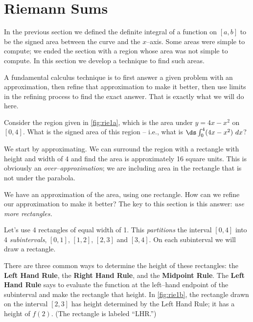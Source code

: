 \section{Riemann Sums}\label{sec:riemann}

In the previous section we defined the definite integral of a function on $[a,b]$ to be the signed area between the curve and the $x$--axis. Some areas were simple to compute; we ended the section with a region whose area was not simple to compute. In this section we develop a technique to find such areas.

A fundamental calculus technique is to first answer a given problem with an approximation, then refine that approximation to make it better, then use limits in the refining process to find the exact answer. That is exactly what we will do here.

Consider the region given in \autoref{fig:rie1a}, which is the area under $y=4x-x^2$ on $[0,4]$. What is the signed area of this region -- i.e., what is $\ds\int_0^4(4x-x^2)\ dx$?


We start by approximating. We can surround the region with a rectangle with height and width of 4 and find the area is approximately 16 square units. This is obviously an \textit{over--approximation}; we are including area in the rectangle that is not under the parabola. 


We have an approximation of the area, using one rectangle. How can we refine our approximation to make it better? The key to this section is this answer: \textit{use more rectangles.}

Let's use 4 rectangles of equal width of 1. This \textit{partitions} the interval $[0,4]$ into 4 \textit{subintervals}, $[0,1]$, $[1,2]$, $[2,3]$ and $[3,4]$. On each subinterval we will draw a rectangle.

There are three common ways to determine the height of these rectangles: the \textbf{Left Hand Rule}, the \textbf{Right Hand Rule}, and the \textbf{Midpoint Rule}. The \textbf{Left Hand Rule} says to evaluate the function at the left--hand endpoint of the subinterval and make the rectangle that height. In \autoref{fig:rie1b}, the rectangle drawn on the interval $[2,3]$ has height determined by the Left Hand Rule; it has a height of $f(2)$. (The rectangle is labeled ``LHR.'')

